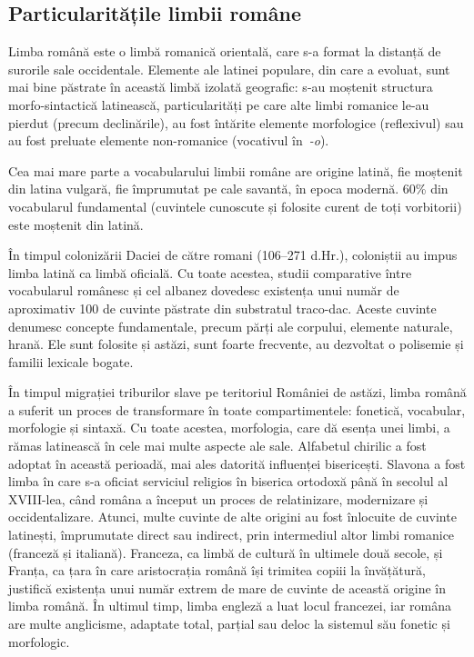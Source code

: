 \begin{multicols}{2}
\subsection{Particularitățile limbii române}
Limba română este o limbă romanică orientală, care s-a format la distanță de surorile sale occidentale. Elemente ale latinei populare, din care a evoluat, sunt mai bine păstrate în această limbă izolată geografic: s-au moștenit structura morfo-sintactică latinească, particularități pe care alte limbi romanice le-au pierdut (precum declinările), au fost întărite elemente morfologice (reflexivul) sau au fost preluate elemente non-romanice (vocativul în~\textit{-o}).

Cea mai mare parte a vocabularului limbii române are origine latină, fie moștenit din latina vulgară, fie împrumutat pe cale savantă, în epoca modernă. 60\% din vocabularul fundamental (cuvintele cunoscute și folosite curent de toți vorbitorii) este moștenit din latină.

În timpul colonizării Daciei de către romani (106--271 d.Hr.), coloniștii au impus limba latină ca limbă oficială. Cu toate acestea, studii comparative între vocabularul românesc și cel albanez dovedesc existența unui număr de aproximativ 100 de cuvinte păstrate din substratul traco-dac. Aceste cuvinte denumesc concepte fundamentale, precum părți ale corpului, elemente naturale, hrană. Ele sunt folosite și astăzi, sunt foarte frecvente, au dezvoltat o polisemie și familii lexicale bogate.

În timpul migrației triburilor slave pe teritoriul României de astăzi, limba română a suferit un proces de transformare în toate compartimentele: fonetică, vocabular, morfologie și sintaxă. Cu toate acestea, morfologia, care dă esența unei limbi, a rămas latinească în cele mai multe aspecte ale sale. Alfabetul chirilic a fost adoptat în această perioadă, mai ales datorită influenței bisericești. Slavona a fost limba în care s-a oficiat serviciul religios în biserica ortodoxă până în secolul al XVIII-lea, când româna a început un proces de relatinizare, modernizare și occidentalizare. Atunci, multe cuvinte de alte origini au fost înlocuite de cuvinte latinești, împrumutate direct sau indirect, prin intermediul altor limbi romanice (franceză și italiană). Franceza, ca limbă de cultură în ultimele două secole, și Franța, ca țara în care aristocrația română își trimitea copiii la învățătură, justifică existența unui număr extrem de mare de cuvinte de această origine în limba română. În ultimul timp, limba engleză a luat locul francezei, iar româna are multe anglicisme, adaptate total, parțial sau deloc la sistemul său fonetic și morfologic. 


\end{multicols}
